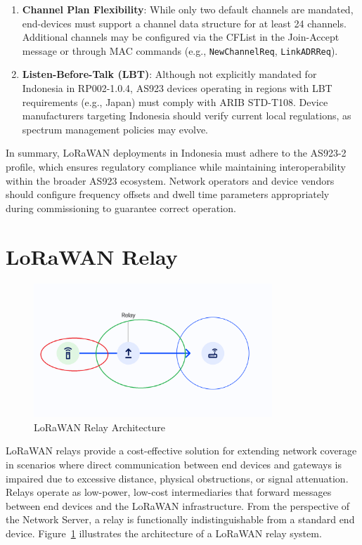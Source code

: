 \begin{enumerate}
    \item \textbf{Channel Plan Flexibility}:
          While only two default channels are mandated, end-devices must support a channel data structure for at least 24 channels. Additional channels may be configured via the CFList in the Join-Accept message or through MAC commands (e.g., \texttt{NewChannelReq}, \texttt{LinkADRReq}).

    \item \textbf{Listen-Before-Talk (LBT)}:
          Although not explicitly mandated for Indonesia in RP002-1.0.4, AS923 devices operating in regions with LBT requirements (e.g., Japan) must comply with ARIB STD-T108. Device manufacturers targeting Indonesia should verify current local regulations, as spectrum management policies may evolve.
\end{enumerate}

In summary, LoRaWAN deployments in Indonesia must adhere to the AS923-2 profile, which ensures regulatory compliance while maintaining interoperability within the broader AS923 ecosystem. Network operators and device vendors should configure frequency offsets and dwell time parameters appropriately during commissioning to guarantee correct operation.


\section{LoRaWAN Relay}
\begin{figure}
    \centering
    \includegraphics[width=0.8\textwidth]{figures/relay-placement.png}
    \caption{LoRaWAN Relay Architecture}
    \label{fig:lora_relay}
\end{figure}

LoRaWAN relays provide a cost-effective solution for extending network coverage in scenarios where direct communication between end devices and gateways is impaired due to excessive distance, physical obstructions, or signal attenuation. Relays operate as low-power, low-cost intermediaries that forward messages between end devices and the LoRaWAN infrastructure. From the perspective of the Network Server, a relay is functionally indistinguishable from a standard end device.
Figure~\ref{fig:lora_relay} illustrates the architecture of a LoRaWAN relay system.

